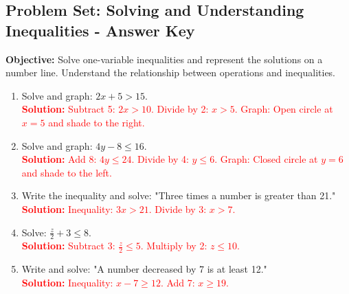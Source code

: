 \documentclass[12pt]{article}
\title{}
\date{}
\begin{document}
\subsection*{Problem Set: Solving and Understanding Inequalities - Answer Key}
\onehalfspacing

\begin{tcolorbox}[colframe=black!40, colback=gray!5, 
coltitle=black, colbacktitle=black!20, fonttitle=\bfseries\Large, 
title=Learning Objective, halign title=center, left=5pt, right=5pt, top=5pt, bottom=15pt]
\textbf{Objective:} Solve one-variable inequalities and represent the solutions on a number line. Understand the relationship between operations and inequalities.
\end{tcolorbox}

\begin{tcolorbox}[colframe=black!60, colback=white, 
coltitle=black, colbacktitle=black!15, fonttitle=\bfseries\Large, 
title=Exercises, halign title=center, left=10pt, right=10pt, top=10pt, bottom=60pt]
\begin{enumerate}[itemsep=3em]
    \item Solve and graph: \( 2x + 5 > 15 \).\\
    \textcolor{red}{\textbf{Solution:} Subtract 5: \( 2x > 10 \). Divide by 2: \( x > 5 \). Graph: Open circle at \( x = 5 \) and shade to the right.}

    \item Solve and graph: \( 4y - 8 \leq 16 \).\\
    \textcolor{red}{\textbf{Solution:} Add 8: \( 4y \leq 24 \). Divide by 4: \( y \leq 6 \). Graph: Closed circle at \( y = 6 \) and shade to the left.}

    \item Write the inequality and solve: "Three times a number is greater than 21."\\
    \textcolor{red}{\textbf{Solution:} Inequality: \( 3x > 21 \). Divide by 3: \( x > 7 \).}

    \item Solve: \( \frac{z}{2} + 3 \leq 8 \).\\
    \textcolor{red}{\textbf{Solution:} Subtract 3: \( \frac{z}{2} \leq 5 \). Multiply by 2: \( z \leq 10 \).}

    \item Write and solve: "A number decreased by 7 is at least 12."\\
    \textcolor{red}{\textbf{Solution:} Inequality: \( x - 7 \geq 12 \). Add 7: \( x \geq 19 \).}


\end{enumerate}
\end{tcolorbox}
\end{document}
